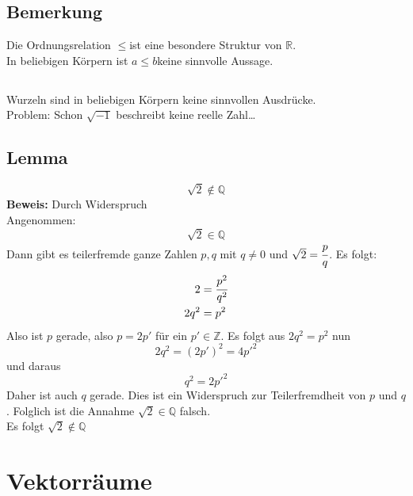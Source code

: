 \subsection{Bemerkung}
Die Ordnungsrelation \grqq$\leq$\grqq ist eine besondere Struktur von $\mathds{R}$. \\
In beliebigen Körpern ist \grqq$a \leq b$\grqq keine sinnvolle Aussage.

\subsection{}
Wurzeln sind in beliebigen Körpern keine sinnvollen Ausdrücke. \\
Problem: Schon $\sqrt{-1}$ beschreibt keine reelle Zahl…

\subsection{Lemma}
\[
\sqrt{2} \not\in \mathds{Q}
\]
\textbf{Beweis:} Durch Widerspruch \\
Angenommen:
\[
\sqrt{2} \in \mathds{Q}
\]
Dann gibt es teilerfremde ganze Zahlen $p,q$ mit $q \not= 0$ und $\sqrt{2}=\cfrac{p}{q}$. Es folgt:
\begin{align*}
2 &= \cfrac{p^2}{q^2} \\
2 q^2 &= p^2
\end{align*}
Also ist $p$ gerade, also $p=2 p'$ für ein $p' \in \mathds{Z}$. Es folgt aus $2 q^2 =p^2 $ nun 
\[
2 q^2 = (2p')^2 = 4 p'^2
\]
und daraus
\[
q^2 = 2 p'^2
\]
Daher ist auch $q$ gerade. Dies ist ein Widerspruch zur Teilerfremdheit von $p$ und $q$. Folglich ist die Annahme $\sqrt{2} \in \mathds{Q}$ falsch. \\
Es folgt $\sqrt{2} \not\in \mathds{Q}$

\section{Vektorräume}

